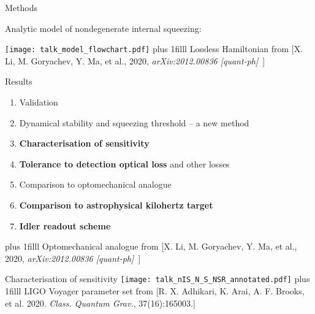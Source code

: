 \documentclass[12pt,xcolor=dvipsnames,aspectratio=169]{beamer}
\newcommand{\vframefill}{\vskip0pt plus 1filll}
\begin{document}
\begin{frame}{Methods}
\begin{flushleft}
Analytic model of nondegenerate internal squeezing:
\end{flushleft}
\centering
\texttt{[image: talk\_model\_flowchart.pdf]}
\vframefill
{\fontsize{5.9}{10}\selectfont\vspace{-0.1cm}Lossless Hamiltonian from [X. Li, M. Goryachev, Y. Ma, et al., 2020, \emph{arXiv:2012.00836 [quant-ph]}\ ]}
\end{frame}

\begin{frame}{Results}
\vspace*{1.1cm}
\begin{enumerate}
\item Validation %
\item Dynamical stability and squeezing threshold -- a new method %
\item \textbf{Characterisation of sensitivity}
\item \textbf{Tolerance to detection optical loss} and other losses
\item Comparison to optomechanical analogue
\item \textbf{Comparison to astrophysical kilohertz target}
\item \textbf{Idler readout scheme} %
\end{enumerate}
\vframefill\centering
{\fontsize{5.9}{10}\selectfont\vspace{-0.1cm}Optomechanical analogue from [X. Li, M. Goryachev, Y. Ma, et al., 2020, \emph{arXiv:2012.00836 [quant-ph]}\ ]} 
\end{frame}

\begin{frame}{Characterisation of sensitivity} %
\centering
\vspace*{1cm}
\texttt{[image: talk\_nIS\_N\_S\_NSR\_annotated.pdf]} %
\vframefill\centering
{\tiny LIGO Voyager parameter set from [R. X. Adhikari, K. Arai, A. F. Brooks, et al. 2020. \emph{Class. Quantum Grav.}, 37(16):165003.]}
\end{frame}
\end{document}
